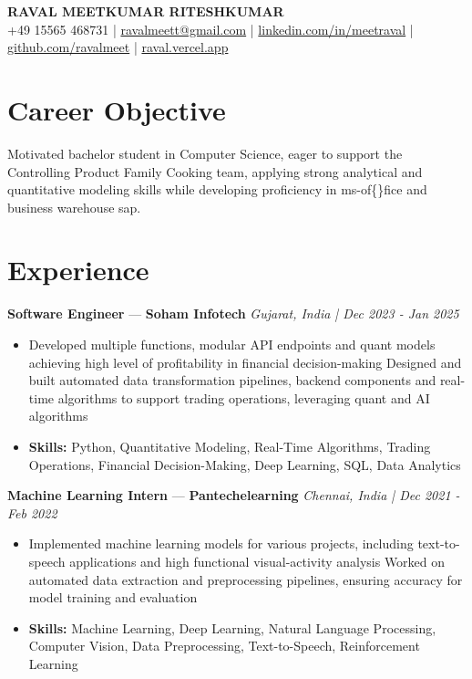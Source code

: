 \documentclass[a4paper,10pt]{article}
\begin{document}
\begin{center}
  {\Large\bfseries RAVAL MEETKUMAR RITESHKUMAR}\\[2pt]
  {\small +49 15565 468731 \;|\; \href{mailto:ravalmeett@gmail.com}{ravalmeett@gmail.com} \;|\; \href{https://www.linkedin.com/in/meetraval/}{linkedin.com/in/meetraval} \;|\; \href{https://github.com/ravalmeet}{github.com/ravalmeet} \;|\; \href{https://raval.vercel.app/}{raval.vercel.app}}
\end{center}
\vspace{-3pt}

\section*{Career Objective}
Motivated bachelor student in Computer Science, eager to support the Controlling Product Family Cooking team, applying strong analytical and quantitative modeling skills while developing proficiency in ms-of\{\}fice and business warehouse sap.\par

\section*{Experience}
\textbf{Software Engineer} — \textbf{Soham Infotech} \hfill \textit{Gujarat, India \;|\; Dec 2023 - Jan 2025}\par
\vspace{1pt}
\begin{itemize}
  \item Developed multiple functions, modular API endpoints and quant models achieving high level of profitability in financial decision-making Designed and built automated data transformation pipelines, backend components and real-time algorithms to support trading operations, leveraging quant and AI algorithms
  \item \textbf{Skills:} Python, Quantitative Modeling, Real-Time Algorithms, Trading Operations, Financial Decision-Making, Deep Learning, SQL, Data Analytics
\end{itemize}
\vspace{3pt}
\textbf{Machine Learning Intern} — \textbf{Pantechelearning} \hfill \textit{Chennai, India \;|\; Dec 2021 - Feb 2022}\par
\vspace{1pt}
\begin{itemize}
  \item Implemented machine learning models for various projects, including text-to-speech applications and high functional visual-activity analysis Worked on automated data extraction and preprocessing pipelines, ensuring accuracy for model training and evaluation
  \item \textbf{Skills:} Machine Learning, Deep Learning, Natural Language Processing, Computer Vision, Data Preprocessing, Text-to-Speech, Reinforcement Learning
\end{itemize}
\end{document}
